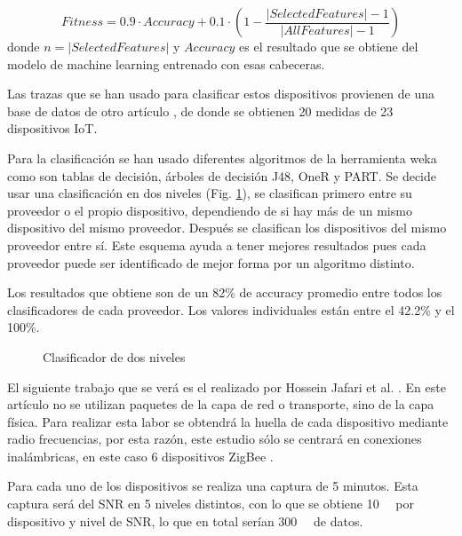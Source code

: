 \begin{equation}
    Fitness = 0.9 \cdot Accuracy + 0.1 \cdot \left( 1 - \frac{\lvert SelectedFeatures \rvert - 1}{\lvert AllFeatures \rvert - 1} \right)
    \label{eq:aksoy_fit}
\end{equation}
donde $n = \lvert SelectedFeatures \rvert$ y $Accuracy$ es el resultado que se obtiene del modelo de machine learning entrenado con esas cabeceras.

Las trazas que se han usado para clasificar estos dispositivos provienen de una base de datos de otro artículo \cite{miettinen2017iot}, de donde se obtienen 20 medidas de 23 dispositivos IoT.

Para la clasificación se han usado diferentes algoritmos de la herramienta \acrfull{weka} \cite{hall2009weka} como son tablas de decisión, árboles de decisión J48, OneR y PART. Se decide usar una clasificación en dos niveles (Fig. \ref{fig:askoy_classifier}), se clasifican primero entre su proveedor o el propio dispositivo, dependiendo de si hay más de un mismo dispositivo del mismo proveedor. Después se clasifican los dispositivos del mismo proveedor entre sí. Este esquema ayuda a tener mejores resultados pues cada proveedor puede ser identificado de mejor forma por un algoritmo distinto.

Los resultados que obtiene son de un 82\% de accuracy promedio entre todos los clasificadores de cada proveedor. Los valores individuales están entre el 42.2\% y el 100\%.

\begin{figure}[htpb!]
    \centering
    \resizebox{0.7\textwidth}{!}{
        
    }
    \caption{Clasificador de dos niveles \cite{aksoy2019automated}}
    \label{fig:askoy_classifier}
\end{figure}

El siguiente trabajo que se verá es el realizado por Hossein Jafari et al. \cite{jafari2018iot}. En este artículo no se utilizan paquetes de la capa de red o transporte, sino de la capa física. Para realizar esta labor se obtendrá la huella de cada dispositivo mediante radio frecuencias, por esta razón, este estudio sólo se centrará en conexiones inalámbricas, en este caso 6 dispositivos ZigBee \cite{gislason2008zigbee}.

Para cada uno de los dispositivos se realiza una captura de 5 minutos. Esta captura será del SNR en 5 niveles distintos, con lo que se obtiene \SI{10}{\giga\byte} por dispositivo y nivel de SNR, lo que en total serían \SI{300}{\giga\byte} de datos.

